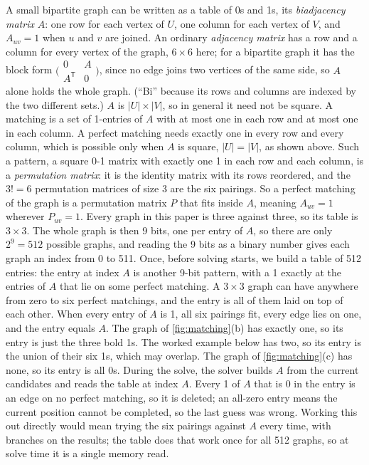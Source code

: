 \documentclass[11pt]{article}
\theoremstyle{definition}
\theoremstyle{plain}
\begin{document}
A small bipartite graph can be written as a table of 0s and 1s, its \emph{biadjacency matrix} $A$: one row for each
vertex of $U$, one column for each vertex of $V$, and $A_{uv}=1$ when $u$ and $v$ are joined. An ordinary
\emph{adjacency matrix} has a row and a column for every vertex of the graph, $6\times 6$ here; for a bipartite graph
it has the block form $\bigl(\begin{smallmatrix} 0 & A \\ A^{\mathsf T} & 0 \end{smallmatrix}\bigr)$, since no edge
joins two vertices of the same side, so $A$ alone holds the whole graph. (``Bi'' because its rows and columns are
indexed by the two different sets.) $A$ is $|U|\times|V|$, so in general it need not be square. A matching is a set of
1-entries of $A$ with at most one in each row and at most one in each column. A perfect matching needs exactly one in
every row and every column, which is possible only when $A$ is square, $|U|=|V|$, as shown above. Such a pattern, a
square 0-1 matrix with exactly one 1 in each row and each column, is a \emph{permutation matrix}: it is the identity
matrix with its rows reordered, and the $3!=6$ permutation matrices of size 3 are the six pairings. So a perfect
matching of the graph is a permutation matrix $P$ that fits inside $A$, meaning $A_{uv}=1$ wherever $P_{uv}=1$. Every
graph in this paper is three against three, so its table is $3\times 3$. The whole graph is then 9 bits, one per entry of $A$, so there
are only $2^9=512$ possible graphs, and reading the 9 bits as a binary number gives each graph an index from 0 to 511.
Once, before solving starts, we build a table of 512 entries: the entry at index $A$ is another 9-bit pattern, with a
1 exactly at the entries of $A$ that lie on some perfect matching. A $3\times 3$ graph can have anywhere from zero to
six perfect matchings, and the entry is all of them laid on top of each other. When every entry of $A$ is 1, all six
pairings fit, every edge lies on one, and the entry equals $A$. The graph of \cref{fig:matching}(b) has exactly one, so
its entry is just the three bold 1s. The worked example below has two, so its entry is the union of their six 1s,
which may overlap. The graph of \cref{fig:matching}(c) has none, so its entry is all 0s. During the solve, the solver builds $A$ from
the current candidates and reads the table at index $A$. Every 1 of $A$ that is 0 in the entry is an edge on no
perfect matching, so it is deleted; an all-zero entry means the current position cannot be completed, so the last
guess was wrong. Working this out directly would mean trying the six pairings against $A$ every time, with branches
on the results; the table does that work once for all 512 graphs, so at solve time it is a single memory read.
\end{document}
